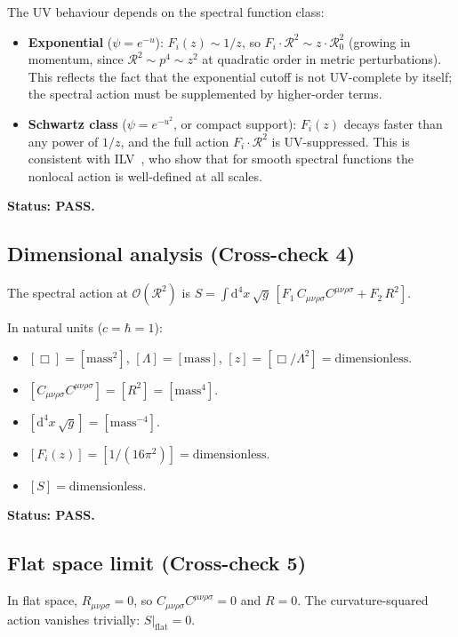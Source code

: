 \documentclass[11pt,a4paper]{article}
\newcommand{\Weylsq}{C_{\mu\nu\rho\sigma}C^{\mu\nu\rho\sigma}}
\renewcommand{\dd}{\mathrm{d}}
\theoremstyle{definition}
\theoremstyle{remark}
\begin{document}
The UV behaviour depends on the spectral function class:
\begin{itemize}[nosep]
\item \textbf{Exponential} ($\psi = e^{-u}$): $F_i(z) \sim 1/z$,
  so $F_i \cdot \mathcal{R}^2 \sim z\cdot\mathcal{R}_0^2$
  (growing in momentum, since $\mathcal{R}^2 \sim p^4 \sim z^2$
  at quadratic order in metric perturbations).
  This reflects the fact that the exponential cutoff is not
  UV-complete by itself; the spectral action must be supplemented
  by higher-order terms.
\item \textbf{Schwartz class} ($\psi = e^{-u^2}$, or compact support):
  $F_i(z)$ decays faster than any power of $1/z$, and the full
  action $F_i \cdot \mathcal{R}^2$ is UV-suppressed.  This is
  consistent with ILV~\cite{ILV2011}, who show that for smooth
  spectral functions the nonlocal action is well-defined at
  all scales.
\end{itemize}

\textbf{Status: PASS.}


\subsection{Dimensional analysis (Cross-check 4)}

The spectral action at $\mathcal{O}(\mathcal{R}^2)$ is
$S = \int \dd^4x\,\sqrt{g}\,[F_1\,\Weylsq + F_2\,R^2]$.

In natural units ($c = \hbar = 1$):
\begin{itemize}
\item $[\Box] = [\text{mass}^2]$, $[\Lambda] = [\text{mass}]$,
  $[z] = [\Box/\Lambda^2] = \text{dimensionless}$.
\item $[\Weylsq] = [R^2] = [\text{mass}^4]$.
\item $[\dd^4x\,\sqrt{g}] = [\text{mass}^{-4}]$.
\item $[F_i(z)] = [1/(16\pi^2)] = \text{dimensionless}$.
\item $[S] = \text{dimensionless}$. \checkmark
\end{itemize}

\textbf{Status: PASS.}


\subsection{Flat space limit (Cross-check 5)}

In flat space, $R_{\mu\nu\rho\sigma} = 0$, so $\Weylsq = 0$ and
$R = 0$.  The curvature-squared action vanishes trivially:
$S|_{\text{flat}} = 0$.
\end{document}
